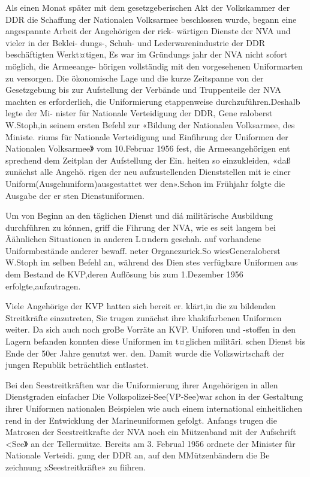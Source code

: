 

Als einen Monat später mit dem gesetzgeberischen
Akt der Volkskammer der DDR die Schaffung der
Nationalen Volksarmee beschlossen wurde, begann
eine angespannte Arbeit der Angehörigen der rick-
wärtigen Dienste der NVA und vieler in der Beklei-
dungs-, Schuh- und Lederwarenindustrie der DDR
beschäftigten Werkt¤tigen, Es war im Gründungs
jahr der NVA nicht sofort möglich, die Armeeange-
hörigen vollständig mit den vorgesehenen Uniformarten zu versorgen. Die ökonomische Lage und die
kurze Zeitspanne von der Gesetzgebung bis zur
Aufstellung der Verbände und Truppenteile der
NVA machten es erforderlich, die Uniformierung
etappenweise durchzuführen.Deshalb legte der Mi-
nister für Nationale Verteidigung der DDR, Gene
raloberst W.Stoph,in seinem ersten Befehl zur
«Bildung der Nationalen Volksarmee, des Ministe.
riums für Nationale Verteidigung und Einfihrung
der Uniformen der Nationalen Volksarmee》 vom
10.Februar 1956 fest, die Armeeangehörigen ent
sprechend dem Zeitplan der Aufstellung der Ein.
heiten so einzukleiden, «daß zunächst alle Angehö.
rigen der neu aufzustellenden Dienststellen mit ie
einer Uniform(Ausgehuniform)ausgestattet wer
den».Schon im Frühjahr folgte die Ausgabe der er
sten Dienstuniformen.

Um von Beginn an den täglichen Dienst und diá
militärische Ausbildung durchführen zu kónnen,
griff die Fihrung der NVA, wie es seit langem bei
Ãähnlichen Situationen in anderen L¤ndern geschah.
auf vorhandene Uniformbestände anderer bewaff.
neter Organezurick.So wiesGeneraloberst
W.Stoph im selben Befehl an, während des Dien
stes verfügbare Uniformen aus dem Bestand de
KVP,deren Auflösung bis zum 1.Dezember 1956
erfolgte,aufzutragen.

Viele Angehörige der KVP hatten sich bereit er.
klärt,in die zu bildenden Streitkräfte einzutreten,
Sie trugen zunächst ihre khakifarbenen Uniformen
weiter. Da sich auch noch groBe Vorräte an KVP.
Uniforen und -stoffen in den Lagern befanden
konnten diese Uniformen im t¤glichen militäri.
schen Dienst bis Ende der 50er Jahre genutzt wer.
den. Damit wurde die Volkswirtschaft der jungen
Republik beträchtlich entlastet.

Bei den Seestreitkräften war die Uniformierung
ihrer Angehörigen in allen Dienstgraden einfacher
Die Volkspolizei-See(VP-See)war schon in der
Gestaltung ihrer Uniformen nationalen Beispielen
wie auch einem international einheitlichen rend
in der Entwicklung der Marineuniformen gefolgt.
Anfangs trugen die Matrosen der Seestreitkrafte der NVA noch ein Mützenband mit der Aufschrift
<See》 an der Tellermütze. Bereits am 3. Februal
1956 ordnete der Minister für Nationale Verteidi.
gung der DDR an, auf den MMützenbändern die Be
zeichnung xSeestreitkräfte» zu fiihren.

